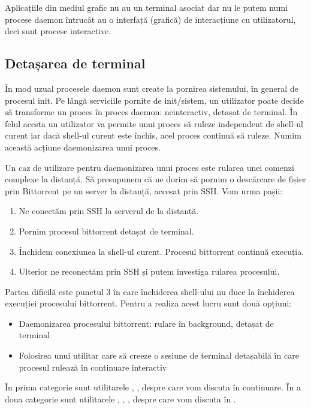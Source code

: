 Aplicațiile din mediul grafic nu au un terminal asociat dar nu le putem numi
procese daemon întrucât au o interfață (grafică) de interacțiune cu
utilizatorul, deci sunt procese interactive.

\subsection{Detașarea de terminal}
\label{sec:process-interactivitate-detasare}

În mod uzual procesele daemon sunt create la pornirea sistemului, în general de
procesul init. Pe lângă serviciile pornite de init/sistem, un utilizator poate
decide să transforme un proces în proces daemon: neinteractiv, detașat de
terminal. În felul acesta un utilizator va permite unui proces să ruleze
independent de shell-ul curent iar dacă shell-ul curent este închis, acel proces
continuă să ruleze. Numim această acțiune daemonizarea unui proces.

Un caz de utilizare pentru daemonizarea unui proces este rularea unei comenzi
complexe la distanță. Să presupunem că ne dorim să pornim o descărcare de fișier
prin Bittorrent pe un server la distanță, accesat prin SSH. Vom urma pașii:

\begin{enumerate}
	\item Ne conectăm prin SSH la serverul de la distanță.
	\item Pornim procesul bittorrent detașat de terminal.
	\item Închidem conexiunea la shell-ul curent. Procesul bittorrent
		continuă execuția.
	\item Ulterior ne reconectăm prin SSH și putem investiga rularea
		procesului.
\end{enumerate}

Partea dificilă este punctul 3 în care închiderea shell-ului nu duce la
închiderea execuției procesului bittorrent. Pentru a realiza acest lucru sunt
două opțiuni:

\begin{itemize}
	\item Daemonizarea procesului bittorrent: rulare în background, detașat
		de terminal
	\item Folosirea unui utilitar care să creeze o sesiune de terminal
		detașabilă în care procesul rulează în continuare interactiv
\end{itemize}

În prima categorie sunt utilitarele , , despre care vom discuta în
continuare. În a doua categorie sunt utilitarele , , , 
despre care vom discuta în
.

